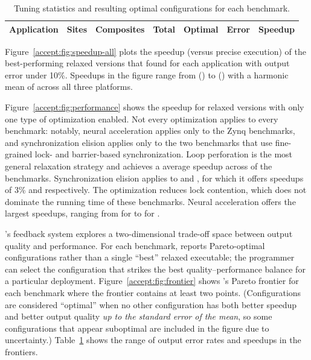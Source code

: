 \begin{table}
\centering
\footnotesize
\begin{tabular}{l r r r r r r}
\toprule
Application & Sites & Composites & Total & Optimal & Error & Speedup \\
\midrule

\bottomrule
\end{tabular}
\caption{Tuning statistics and resulting optimal configurations for each benchmark.}
\label{accept:table:stats}
\end{table}

Figure~\ref{accept:fig:speedup-all} plots the speedup (versus precise execution) of the
best-performing relaxed versions that \sysname found for each application with
output error under 10\%.
Speedups in the figure range from 
() to 
() with
a harmonic mean of  across all three platforms.

Figure~\ref{accept:fig:performance} shows the speedup for relaxed versions with only
one type of optimization enabled.
Not every optimization applies to every benchmark: notably, neural
acceleration applies only to the Zynq benchmarks, and synchronization elision
applies only to the two benchmarks that use fine-grained lock- and
barrier-based synchronization.
Loop perforation is the most general relaxation strategy and achieves a
 average speedup across
 of the benchmarks.
Synchronization elision applies to  and
, for which it offers speedups of
3\%  %
and  respectively.
The optimization reduces lock contention, which does not dominate the running
time of these benchmarks.
Neural acceleration offers the largest speedups, ranging from
 for 
to
 for .

\sysname's feedback system explores a two-dimensional trade-off space between
output quality and performance. For each benchmark, \sysname reports
Pareto-optimal configurations rather than a single ``best'' relaxed executable;
the
programmer can select the configuration that strikes the best
quality--performance balance for a particular deployment.
%
Figure~\ref{accept:fig:frontier} shows \sysname's Pareto frontier for each
benchmark where the frontier contains at least two points.
(Configurations are considered ``optimal'' when no other configuration has
both better speedup and better output quality \emph{up to the standard error
of the mean}, so some configurations that appear suboptimal are included in
the figure due to uncertainty.)
%
Table~\ref{accept:table:stats} shows the range of output error rates and
speedups in the frontiers.

